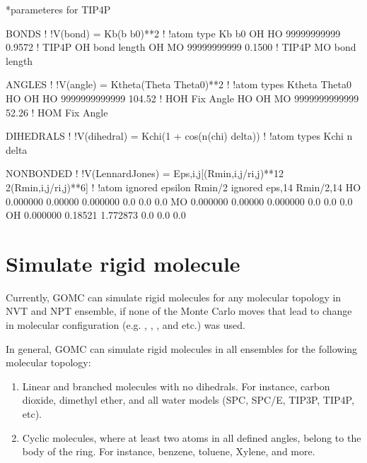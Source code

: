 \documentclass[letterpaper,10pt,english]{sphinxmanual}
\begin{document}
\begin{sphinxVerbatim}[commandchars=\\\{\}]
*parameteres for TIP4P

BONDS
!
!V(bond) = Kb(b \PYGZhy{} b0)**2
!
!atom type          Kb          b0
OH   HO    99999999999       0.9572 ! TIP4P O\PYGZhy{}H bond length
OH   MO    99999999999       0.1500 ! TIP4P M\PYGZhy{}O bond length


ANGLES
!
!V(angle) = Ktheta(Theta \PYGZhy{} Theta0)**2
!
!atom types         Ktheta       Theta0
HO   OH   HO    9999999999999    104.52  ! H\PYGZhy{}O\PYGZhy{}H Fix Angle
HO   OH   MO    9999999999999     52.26  ! H\PYGZhy{}O\PYGZhy{}M Fix Angle


DIHEDRALS
!
!V(dihedral) = Kchi(1 + cos(n(chi) \PYGZhy{} delta))
!
!atom types             Kchi    n   delta


NONBONDED
!
!V(Lennard\PYGZhy{}Jones) = Eps,i,j[(Rmin,i,j/ri,j)**12 \PYGZhy{} 2(Rmin,i,j/ri,j)**6]
!
!atom  ignored      epsilon      Rmin/2   ignored   eps,1\PYGZhy{}4    Rmin/2,1\PYGZhy{}4
HO      0.000000     0.00000    0.000000    0.0     0.0         0.0
MO      0.000000     0.00000    0.000000    0.0     0.0         0.0
OH      0.000000    \PYGZhy{}0.18521    1.772873    0.0     0.0         0.0
\end{sphinxVerbatim}


\section{Simulate rigid molecule}
\label{\detokenize{howto:simulate-rigid-molecule}}
\sphinxAtStartPar
Currently, GOMC can simulate rigid molecules for any molecular topology in NVT and NPT ensemble, if none of the Monte Carlo moves that lead to change in
molecular configuration (e.g. , , , and etc.) was used.

\sphinxAtStartPar
In general, GOMC can simulate rigid molecules in all ensembles for the following molecular topology:
\begin{enumerate}
%
\item {} 
\sphinxAtStartPar
Linear and branched molecules with no dihedrals. For instance, carbon dioxide, dimethyl ether, and all water models (SPC, SPC/E, TIP3P, TIP4P, etc).

\item {} 
\sphinxAtStartPar
Cyclic molecules, where at least two atoms in all defined angles, belong to the body of the ring. For instance, benzene, toluene, Xylene, and more.

\end{enumerate}
\end{document}
